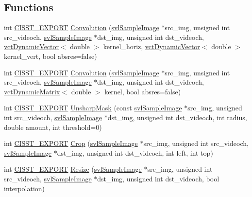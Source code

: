 \subsection*{Functions}
\begin{DoxyCompactItemize}
\item 
int \hyperlink{cmn_export_macros_8h_a99393e0c3ac434b2605235bbe20684f8}{C\+I\+S\+S\+T\+\_\+\+E\+X\+P\+O\+R\+T} \hyperlink{namespacesvl_image_processing_afec459e2a0098f55c4bbf6046eb3aaa1}{Convolution} (\hyperlink{classsvl_sample_image}{svl\+Sample\+Image} $\ast$src\+\_\+img, unsigned int src\+\_\+videoch, \hyperlink{classsvl_sample_image}{svl\+Sample\+Image} $\ast$dst\+\_\+img, unsigned int dst\+\_\+videoch, \hyperlink{classvct_dynamic_vector}{vct\+Dynamic\+Vector}$<$ double $>$ kernel\+\_\+horiz, \hyperlink{classvct_dynamic_vector}{vct\+Dynamic\+Vector}$<$ double $>$ kernel\+\_\+vert, bool absres=false)
\item 
int \hyperlink{cmn_export_macros_8h_a99393e0c3ac434b2605235bbe20684f8}{C\+I\+S\+S\+T\+\_\+\+E\+X\+P\+O\+R\+T} \hyperlink{namespacesvl_image_processing_a880dbed3ab656ceaa85d30c1a21e4e22}{Convolution} (\hyperlink{classsvl_sample_image}{svl\+Sample\+Image} $\ast$src\+\_\+img, unsigned int src\+\_\+videoch, \hyperlink{classsvl_sample_image}{svl\+Sample\+Image} $\ast$dst\+\_\+img, unsigned int dst\+\_\+videoch, \hyperlink{classvct_dynamic_matrix}{vct\+Dynamic\+Matrix}$<$ double $>$ kernel, bool absres=false)
\item 
int \hyperlink{cmn_export_macros_8h_a99393e0c3ac434b2605235bbe20684f8}{C\+I\+S\+S\+T\+\_\+\+E\+X\+P\+O\+R\+T} \hyperlink{namespacesvl_image_processing_a80042923e0363cf08cb045b22d5a94f9}{Unsharp\+Mask} (const \hyperlink{classsvl_sample_image}{svl\+Sample\+Image} $\ast$src\+\_\+img, unsigned int src\+\_\+videoch, \hyperlink{classsvl_sample_image}{svl\+Sample\+Image} $\ast$dst\+\_\+img, unsigned int dst\+\_\+videoch, int radius, double amount, int threshold=0)
\item 
int \hyperlink{cmn_export_macros_8h_a99393e0c3ac434b2605235bbe20684f8}{C\+I\+S\+S\+T\+\_\+\+E\+X\+P\+O\+R\+T} \hyperlink{namespacesvl_image_processing_a1c84cbebcb082d646b0e304ac23042f3}{Crop} (\hyperlink{classsvl_sample_image}{svl\+Sample\+Image} $\ast$src\+\_\+img, unsigned int src\+\_\+videoch, \hyperlink{classsvl_sample_image}{svl\+Sample\+Image} $\ast$dst\+\_\+img, unsigned int dst\+\_\+videoch, int left, int top)
\item 
int \hyperlink{cmn_export_macros_8h_a99393e0c3ac434b2605235bbe20684f8}{C\+I\+S\+S\+T\+\_\+\+E\+X\+P\+O\+R\+T} \hyperlink{namespacesvl_image_processing_ad12f45ec4313ca217249da5793a0e9da}{Resize} (\hyperlink{classsvl_sample_image}{svl\+Sample\+Image} $\ast$src\+\_\+img, unsigned int src\+\_\+videoch, \hyperlink{classsvl_sample_image}{svl\+Sample\+Image} $\ast$dst\+\_\+img, unsigned int dst\+\_\+videoch, bool interpolation)

\end{DoxyCompactItemize}
